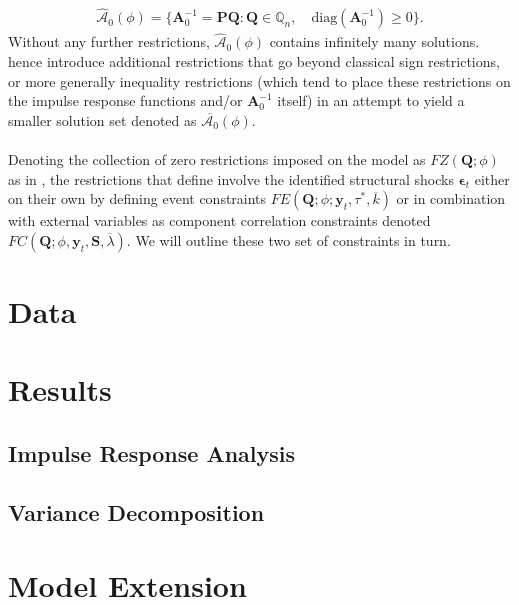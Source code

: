 \documentclass[a4paper,11pt,listof=nochaptergap,oneside,pointednumbers,bibtotoc,bigheadings,liststotoc]{scrbook}
\theoremstyle{mysatz}
\theoremstyle{mydefinition}
\theoremstyle{mybemerkung}
\let\oldhat\hat
\newcommand{\vect}[1]{\boldsymbol{\mathbf{#1}}}
\newcommand{\hatt}[1]{\oldhat{\boldsymbol{\mathbf{#1}}}}
\begin{document}
\begin{equation} \label{eq:svar_ludvi8}
\begin{split}
 			\hatt{\mathcal{A}}_0(\phi) = \{\vect{A}_0^{-1} = \vect{P}\vect{Q}: \vect{Q} \in \mathbb{Q}_n, \quad \text{diag}(\vect{A}_0^{-1}) \geq 0\}.
\end{split}								
\end{equation}
Without any further restrictions, $\hatt{\mathcal{A}}_0(\phi)$ contains infinitely many solutions. \citet{ludvigsonetal:18} hence introduce additional restrictions that go beyond classical sign restrictions, or more generally inequality restrictions (which tend to place these restrictions on the impulse response functions and/or $\vect{A}_0^{-1}$ itself) in an attempt to yield a smaller solution set denoted as $\overline{\mathcal{A}_0}(\phi)$.\\
\\
Denoting the collection of zero restrictions imposed on the model as $FZ(\vect{Q}; \phi)$ as in \citet{rubioetal:10}, the restrictions that \citet{ludvigsonetal:18} define involve the identified structural shocks $\vect{\epsilon}_t$ either on their own by defining event constraints $FE(\vect{Q}; \phi; \vect{y}_t, \tau^*, \overline{k})$ or in combination with external variables as component correlation constraints denoted $FC(\vect{Q}; \phi, \vect{y}_t, \vect{S}, \overline{\lambda})$. We will outline these two set of constraints in turn.


\chapter{Data}
\label{sec:Data}

\chapter{Results}
\label{sec:Results}

\section[Impulse Response Analysis]{Impulse Response Analysis}
\label{sec:ImpulseResponseAnalysis}

\section[Variance Decomposition]{Variance Decomposition}
\label{sec:VarianceDecomposition}


\chapter{Model Extension}
\label{sec:ModelExtension}
\end{document}
